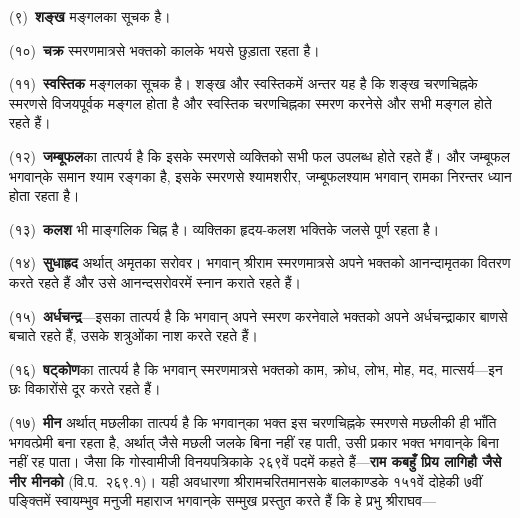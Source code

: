 \begin{sloppypar}\justifying{}
(९)~\textbf{शङ्ख} मङ्गलका सूचक है।
\end{sloppypar}
\begin{sloppypar}\justifying{}
(१०)~\textbf{चक्र} स्मरण\-मात्रसे भक्तको कालके भयसे छुड़ाता रहता है।
\end{sloppypar}
\begin{sloppypar}\justifying{}
(११)~\textbf{स्वस्तिक} मङ्गलका सूचक है। शङ्ख और स्वस्तिकमें अन्तर यह है कि शङ्ख चरणचिह्नके स्मरणसे विजयपूर्वक मङ्गल होता है और स्वस्तिक चरणचिह्नका स्मरण करनेसे और सभी मङ्गल होते रहते हैं।
\end{sloppypar}
\begin{sloppypar}\justifying{}
(१२)~\textbf{जम्बूफल}का तात्पर्य है कि इसके स्मरणसे व्यक्तिको सभी फल उपलब्ध होते रहते हैं। और जम्बूफल भगवान्‌के समान श्याम रङ्गका है, इसके स्मरणसे श्यामशरीर, जम्बूफलश्याम भगवान् रामका निरन्तर ध्यान होता रहता है।
\end{sloppypar}
\begin{sloppypar}\justifying{}
(१३)~\textbf{कलश} भी माङ्गलिक चिह्न है। व्यक्तिका हृदय-कलश भक्तिके जलसे पूर्ण रहता है।
\end{sloppypar}
\begin{sloppypar}\justifying{}
(१४)~\textbf{सुधाह्रद} अर्थात् अमृतका सरोवर। भगवान् श्रीराम स्मरण\-मात्रसे अपने भक्तको आनन्दामृतका वितरण करते रहते हैं और उसे आनन्दसरोवरमें स्नान कराते रहते हैं।
\end{sloppypar}
\begin{sloppypar}\justifying{}
(१५)~\textbf{अर्धचन्द्र}—इसका तात्पर्य है कि भगवान् अपने स्मरण करनेवाले भक्तको अपने अर्धचन्द्राकार बाणसे बचाते रहते हैं, उसके शत्रुओंका नाश करते रहते हैं।
\end{sloppypar}
\begin{sloppypar}\justifying{}
(१६)~\textbf{षट्कोण}का तात्पर्य है कि भगवान् स्मरण\-मात्रसे भक्तको काम, क्रोध, लोभ, मोह, मद, मात्सर्य—इन छः विकारोंसे दूर करते रहते हैं।
\end{sloppypar}
\begin{sloppypar}\justifying{}
(१७)~\textbf{मीन} अर्थात् मछलीका तात्पर्य है कि भगवान्‌का भक्त इस चरण\-चिह्नके स्मरणसे मछलीकी ही भाँति भगवत्प्रेमी बना रहता है, अर्थात् जैसे मछली जलके बिना नहीं रह पाती, उसी प्रकार भक्त भगवान्‌के बिना नहीं रह पाता। जैसा कि गोस्वामीजी विनयपत्रिकाके २६९वें पदमें कहते हैं—\textbf{राम कबहुँ प्रिय लागिहौ जैसे नीर मीनको} (वि.प.~२६९.१)। यही अवधारणा श्रीरामचरितमानसके बालकाण्डके १५१वें दोहेकी ७वीं पङ्क्तिमें स्वायम्भुव मनुजी महाराज भगवान्‌के सम्मुख प्रस्तुत करते हैं कि हे प्रभु श्रीराघव—
\end{sloppypar}

